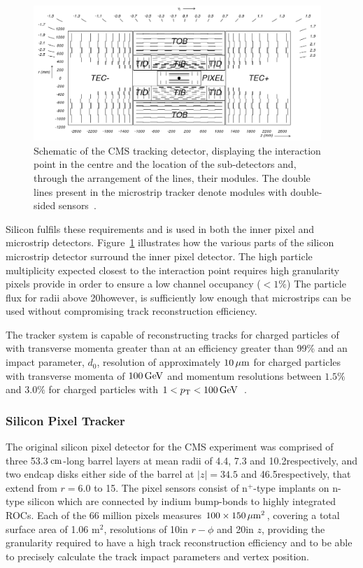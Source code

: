 \begin{figure}[htb]
\begin{center}
\includegraphics[width=0.97\textwidth]{figs/cms/fig_cmstracker.png}
\caption{Schematic of the CMS tracking detector, displaying the interaction point in the centre and the location of the sub-detectors and, through the arrangement of the lines, their modules. The double lines present in the microstrip tracker denote modules with double-sided sensors~\cite{Sprenger:2010ss}.}
\label{fig:tracker}
\end{center}
\end{figure}

Silicon fulfils these requirements and is used in both the inner pixel and microstrip detectors.
Figure~\ref{fig:tracker} illustrates how the various parts of the silicon microstrip detector surround the inner pixel detector.
The high particle multiplicity expected closest to the interaction point requires high granularity pixels provide in order to ensure a low channel occupancy ($< 1\%$)
The particle flux for radii above 20\cm however, is sufficiently low enough that microstrips can be used without compromising track reconstruction efficiency.

The tracker system is capable of reconstructing tracks for charged particles of with transverse momenta greater than at an efficiency greater than 99\% and an impact parameter, $d_{0}$, resolution of approximately $10\,\mu\text{m}$ for charged particles with transverse momenta of $100\,\text{Ge\hspace{-.08em}V}$ and momentum resolutions between $1.5\%$ and $3.0\%$ for charged particles with $1 < p_{\mathrm{T}} < 100\,\text{Ge\hspace{-.08em}V}$~\cite{Khachatryan:2010pw,Chatrchyan:2014fea}.

\subsubsection{Silicon Pixel Tracker}
The original silicon pixel detector for the CMS experiment was comprised of three 53.3$\,\text{cm}$-long barrel layers at mean radii of 4.4, 7.3 and 10.2\cm respectively, and two endcap disks either side of the barrel at $|z| = 34.5$ and 46.5\cm respectively, that extend from $r = 6.0$ to 15\cm.
The pixel sensors consist of n$^{+}$-type implants on n-type silicon which are connected by indium bump-bonds to highly integrated ROCs.
Each of the 66 million pixels measures $100 \times 150\,\mu\text{m}^{2}$, covering a total surface area of 1.06 m$^{2}$, resolutions of 10\mum in $r-\phi$ and 20\mum in $z$, providing the granularity required to have a high track reconstruction efficiency and to be able to precisely calculate the track impact parameters and vertex position.

